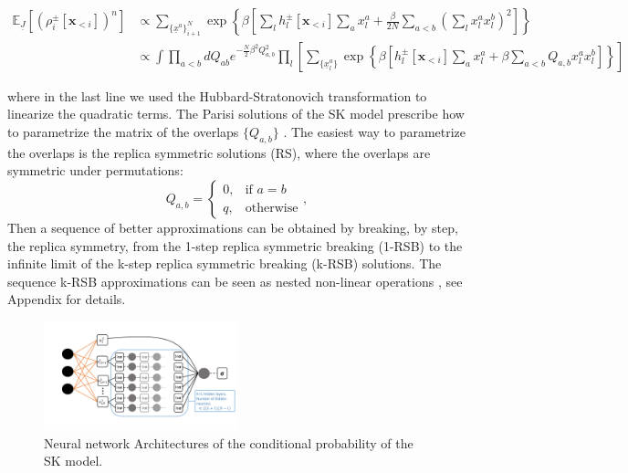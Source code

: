 \documentclass[aps,physrev,10pt,floatfix,reprint]{revtex4-2}
\begin{document}
\begin{widetext}
\begin{align}
\mathbb{E}_{\underline{J}}\left[(\rho_i^{\pm}[\mathbf{x}_{<i}])^n \right]
& \propto  
\sum_{\{\underline{x}^{a}\}_{i+1}^N} 
\exp\left\{\beta \left[
\sum_{l} h_l^{\pm}[\mathbf{x}_{<i}] \sum_{a} x_l^{a} +\frac{\beta}{2N} \sum_{a<b} \left( \sum_{l}  x_l^{a} x_l^{b} \right)^2 \right]  \right\}\\
& \propto  \int \prod_{a<b} dQ_{ab} e^{-\frac{N}{2}\beta^2Q_{a,b}^2}
\prod_{l} \left[
\sum_{\{\underline{x}^{a}_l\}} 
\exp\left\{\beta \left[
h_l^{\pm}[\mathbf{x}_{<i}] \sum_{a} x_l^{a} +\beta \sum_{a<b} Q_{a,b}  x_l^{a} x_l^{b} \right]  \right\}
\right]
\end{align}
\end{widetext}
where in the last line we used the Hubbard-Stratonovich transformation to linearize the quadratic terms. 
The Parisi solutions of the SK model prescribe how to parametrize the matrix of the overlaps $\{Q_{a,b}\}$ \cite{10.1142/0271}. The easiest way to parametrize the overlaps is the replica symmetric solutions (RS), where the overlaps are symmetric under permutations: 
$$
Q_{a,b}=\begin{cases}
			0, & \text{if $a=b$}\\
            q, & \text{otherwise}
		 \end{cases},
$$
Then a sequence of better approximations can be obtained by breaking, by step, the replica symmetry, from the 1-step replica symmetric breaking (1-RSB) to the infinite limit of the k-step replica symmetric breaking (k-RSB) solutions. 
The sequence k-RSB approximations can be seen as nested non-linear operations \cite{Parisi_1980}, see Appendix for details. 
\begin{figure}[!h]
    \centering 
    \includegraphics[width=0.5\textwidth]{img/SK_arch.pdf}
    \caption{Neural network Architectures of the conditional probability of the SK model.}
    \label{fig:SK_arch}
\end{figure}
\end{document}
